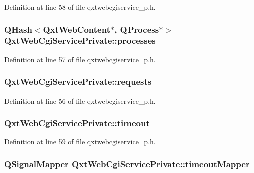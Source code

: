 Definition at line 58 of file qxtwebcgiservice\-\_\-p.\-h.

\hypertarget{class_qxt_web_cgi_service_private_af31fce07e535ed1f2af9d23dd4db706d}{
\subsubsection[{processes}]{\setlength{\rightskip}{0pt plus 5cm}Q\-Hash$<${\bf Qxt\-Web\-Content}$\ast$, Q\-Process$\ast$$>$ Qxt\-Web\-Cgi\-Service\-Private\-::processes}}\label{class_qxt_web_cgi_service_private_af31fce07e535ed1f2af9d23dd4db706d}


Definition at line 57 of file qxtwebcgiservice\-\_\-p.\-h.

\hypertarget{class_qxt_web_cgi_service_private_ab50f2eeb24417a253983378b7b93fc50}{
\subsubsection[{requests}]{ Qxt\-Web\-Cgi\-Service\-Private\-::requests}}\label{class_qxt_web_cgi_service_private_ab50f2eeb24417a253983378b7b93fc50}


Definition at line 56 of file qxtwebcgiservice\-\_\-p.\-h.

\hypertarget{class_qxt_web_cgi_service_private_a1be508ec8021dfccdd69454fd791eec6}{
\subsubsection[{timeout}]{ Qxt\-Web\-Cgi\-Service\-Private\-::timeout}}\label{class_qxt_web_cgi_service_private_a1be508ec8021dfccdd69454fd791eec6}


Definition at line 59 of file qxtwebcgiservice\-\_\-p.\-h.

\hypertarget{class_qxt_web_cgi_service_private_a4d289adefd11ab5f71c9288a02758802}{
\subsubsection[{timeout\-Mapper}]{\setlength{\rightskip}{0pt plus 5cm}Q\-Signal\-Mapper Qxt\-Web\-Cgi\-Service\-Private\-::timeout\-Mapper}}\label{class_qxt_web_cgi_service_private_a4d289adefd11ab5f71c9288a02758802}


